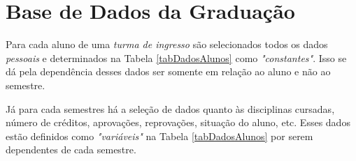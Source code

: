 \documentclass[cic,tc]{iiufrgs}
\begin{document}
\section{Base de Dados da Graduação}

Para cada aluno de uma \textit{turma de ingresso} são selecionados todos os dados \textit{pessoais} e determinados na Tabela \ref{tabDadosAlunos} como \textit{"constantes"}. Isso se dá pela dependência desses dados ser somente em relação ao aluno e não ao semestre.

Já para cada semestres há a seleção de dados quanto às disciplinas cursadas, número de créditos, aprovações, reprovações, situação do aluno, etc. Esses dados estão definidos como \textit{"variáveis"} na Tabela \ref{tabDadosAlunos} por serem dependentes de cada semestre.
\end{document}
